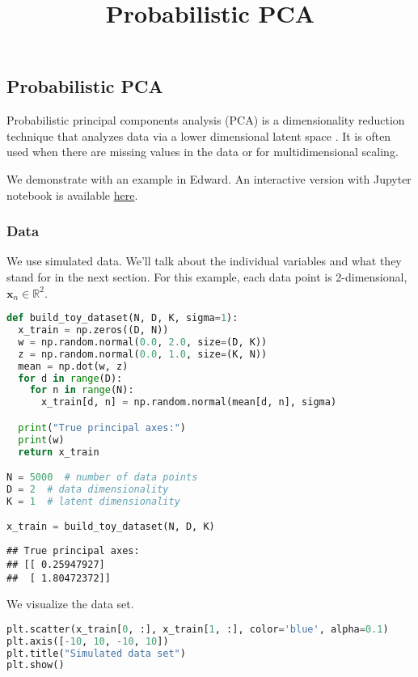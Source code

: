 \title{Probabilistic PCA}

\subsection{Probabilistic PCA}

Probabilistic principal components analysis (PCA) is a
dimensionality reduction technique that
analyzes data via a lower dimensional latent space
\citep{tipping1999probabilistic}. It is often
used when there are missing values in the data or for multidimensional
scaling.

We demonstrate with an example in Edward.
An interactive version with Jupyter notebook is available
\href{http://nbviewer.jupyter.org/github/blei-lab/edward/blob/master/notebooks/probabilistic_pca.ipynb}{here}.

\subsubsection{Data}

We use simulated data. We'll talk about the individual variables and
what they stand for in the next section. For this example, each data
point is 2-dimensional, $\mathbf{x}_n\in\mathbb{R}^2$.

\begin{lstlisting}[language=Python]
def build_toy_dataset(N, D, K, sigma=1):
  x_train = np.zeros((D, N))
  w = np.random.normal(0.0, 2.0, size=(D, K))
  z = np.random.normal(0.0, 1.0, size=(K, N))
  mean = np.dot(w, z)
  for d in range(D):
    for n in range(N):
      x_train[d, n] = np.random.normal(mean[d, n], sigma)

  print("True principal axes:")
  print(w)
  return x_train

N = 5000  # number of data points
D = 2  # data dimensionality
K = 1  # latent dimensionality

x_train = build_toy_dataset(N, D, K)
\end{lstlisting}

\begin{lstlisting}
## True principal axes:
## [[ 0.25947927]
##  [ 1.80472372]]
\end{lstlisting}

We visualize the data set.

\begin{lstlisting}[language=Python]
plt.scatter(x_train[0, :], x_train[1, :], color='blue', alpha=0.1)
plt.axis([-10, 10, -10, 10])
plt.title("Simulated data set")
plt.show()
\end{lstlisting}

